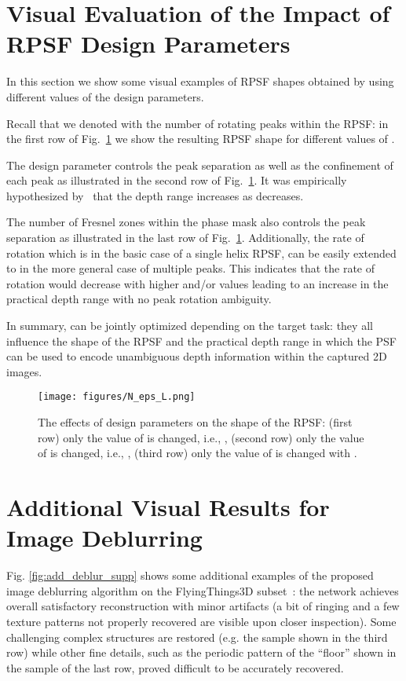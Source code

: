 \documentclass[preprint,5p,twocolumn]{elsarticle}
\begin{document}
\section{Visual Evaluation of the Impact of RPSF Design Parameters}
\label{sec:rpsf}


In this section we show some visual examples of  RPSF shapes obtained by using different values of the design parameters.

Recall that we denoted with   the number of rotating peaks within the RPSF:
in the first row of Fig.~\ref{fig:N_eps_L} we show the resulting RPSF shape for different values of .

The design parameter  controls the peak separation as well as the confinement of each peak as illustrated in the second row of Fig.~\ref{fig:N_eps_L}. It was empirically hypothesized by~\cite{berlich2018high} that the depth range increases as  decreases.

The number of Fresnel zones  within the phase mask also controls the peak separation as illustrated in the last row of Fig.~\ref{fig:N_eps_L}.
Additionally, the rate of rotation which is  in the basic case of a single helix RPSF, can be easily extended to  in the more general case of multiple peaks.
This indicates that the rate of rotation would decrease with higher  and/or  values leading to an increase in the practical depth range with no peak rotation ambiguity. 

In summary,  can be jointly optimized depending on the target task: they all influence the shape of the RPSF and the practical depth range in which the PSF can be used to encode unambiguous depth information within the captured 2D images.

 \begin{figure}[h!]
 \centering
 \texttt{[image: figures/N\_eps\_L.png]}
 \caption{The effects of   design parameters on the shape of the RPSF: (first row) only the value of  is changed, i.e., , (second row) only the value of  is changed, i.e., , (third row) only the value of  is changed with . }
 \label{fig:N_eps_L}
\end{figure}

\section{Additional Visual Results for Image Deblurring}
\label{sec:res1}




Fig. \ref{fig:add_deblur_supp} shows some additional examples of the proposed image deblurring algorithm on   the FlyingThings3D subset~\cite{MIFDB16}: the network achieves overall satisfactory reconstruction with minor artifacts (a bit of ringing and a few texture patterns not properly recovered are visible upon closer inspection). Some challenging complex structures are restored (e.g. the sample shown in the third row) while other fine details, such as the periodic pattern of the ``floor'' shown in the sample of the last row, proved difficult  to be accurately recovered.
\end{document}
